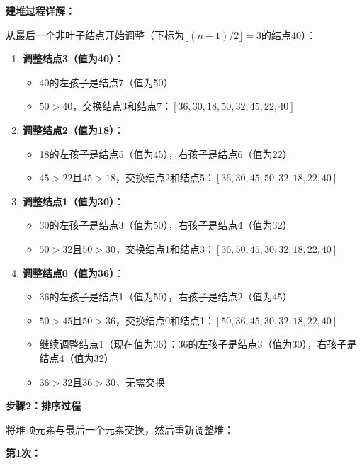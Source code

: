 \documentclass[12pt,a4paper]{amsart}
\begin{document}
\textbf{建堆过程详解：}

从最后一个非叶子结点开始调整（下标为$\lfloor(n-1)/2\rfloor = 3$的结点40）：

\begin{enumerate}
\item \textbf{调整结点3（值为40）}：
    \begin{itemize}
    \item 40的左孩子是结点7（值为50）
    \item $50 > 40$，交换结点3和结点7：$[36, 30, 18, 50, 32, 45, 22, 40]$
    \end{itemize}

\item \textbf{调整结点2（值为18）}：
    \begin{itemize}
    \item 18的左孩子是结点5（值为45），右孩子是结点6（值为22）
    \item $45 > 22$且$45 > 18$，交换结点2和结点5：$[36, 30, 45, 50, 32, 18, 22, 40]$
    \end{itemize}

\item \textbf{调整结点1（值为30）}：
    \begin{itemize}
    \item 30的左孩子是结点3（值为50），右孩子是结点4（值为32）
    \item $50 > 32$且$50 > 30$，交换结点1和结点3：$[36, 50, 45, 30, 32, 18, 22, 40]$
    \end{itemize}

\item \textbf{调整结点0（值为36）}：
    \begin{itemize}
    \item 36的左孩子是结点1（值为50），右孩子是结点2（值为45）
    \item $50 > 45$且$50 > 36$，交换结点0和结点1：$[50, 36, 45, 30, 32, 18, 22, 40]$
    \item 继续调整结点1（现在值为36）：36的左孩子是结点3（值为30），右孩子是结点4（值为32）
    \item $36 > 32$且$36 > 30$，无需交换
    \end{itemize}
\end{enumerate}

\textbf{步骤2：排序过程}

将堆顶元素与最后一个元素交换，然后重新调整堆：

\textbf{第1次：}
\begin{center}
\end{center}
\end{document}
